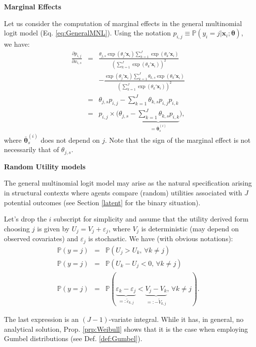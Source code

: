 \documentclass[
  12pt,
]{book}
\theoremstyle{definition}
\theoremstyle{definition}
\theoremstyle{definition}
\theoremstyle{definition}
\theoremstyle{remark}
\begin{document}
\textbf{Marginal Effects}

Let us consider the computation of marginal effects in the general multinomial logit model (Eq. \eqref{eq:GeneralMNL}). Using the notation \(p_{i,j} \equiv \mathbb{P}(y_i=j|\mathbf{x}_i;\boldsymbol\theta)\), we have:
\begin{eqnarray*}
\frac{\partial p_{i,j}}{\partial x_{i,s}} &=& \frac{\theta_{j,s}\exp(\theta_j'\mathbf{x}_i)\sum_{k=1}^J \exp(\theta_k'\mathbf{x}_i)}{(\sum_{k=1}^J \exp(\theta_k'\mathbf{x}_i))^2} \\
&& - \frac{\exp(\theta_j'\mathbf{x}_i)\sum_{k=1}^J \theta_{k,s} \exp(\theta_k'\mathbf{x}_i)}{(\sum_{k=1}^J \exp(\theta_k'\mathbf{x}_i))^2}\\
&=& \theta_{j,s} p_{i,j} - \sum_{k=1}^J \theta_{k,s} p_{i,j}p_{i,k}\\
&=&  p_{i,j} \times \Big(\theta_{j,s} - \underbrace{\sum_{k=1}^J \theta_{k,s} p_{i,k}}_{=\overline{\boldsymbol{\theta}}^{(i)}_{s}}\Big),
\end{eqnarray*}
where \(\overline{\boldsymbol\theta}^{(i)}_{s}\) does not depend on \(j\). Note that the sign of the marginal effect is not necessarily that of \(\theta_{j,s}\).

\textbf{Random Utility models}

The general multinomial logit model may arise as the natural specification arising in structural contexts where agents compare (random) utilities associated with \(J\) potential outcomes (see Section \ref{latent} for the binary situation).

Let's drop the \(i\) subscript for simplicity and assume that the utility derived form choosing \(j\) is given by \(U_j = V_j + \varepsilon_j\), where \(V_j\) is deterministic (may depend on observed covariates) and \(\varepsilon_j\) is stochastic. We have (with obvious notations):
\begin{eqnarray*}
\mathbb{P}(y=j) &=& \mathbb{P}(U_j>U_k,\,\forall k \ne j)\\
\mathbb{P}(y=j) &=& \mathbb{P}(U_k-U_j<0,\,\forall k \ne j)\\
\mathbb{P}(y=j) &=& \mathbb{P}(\underbrace{\varepsilon_k-\varepsilon_j}_{=:\tilde\varepsilon_{k,j}}<\underbrace{V_j - V_k}_{=:-\tilde{V}_{k,j}},\,\forall k \ne j).
\end{eqnarray*}

The last expression is an \((J-1)\)-variate integral. While it has, in general, no analytical solution, Prop. \ref{prp:Weibull} shows that it is the case when employing Gumbel distributions (see Def. \ref{def:Gumbel}).
\end{document}
